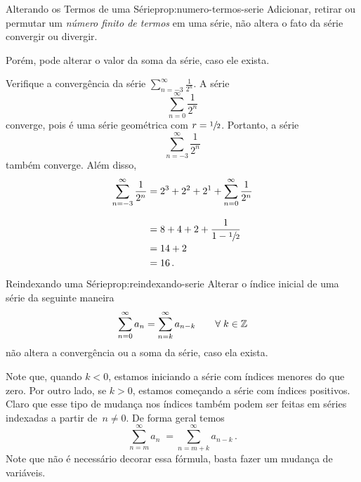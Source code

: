 \begin{proposicao}{Alterando os Termos de uma Série}{prop:numero-termos-serie}
  Adicionar, retirar ou permutar um \emph{número finito de termos} em uma série,
  não altera o fato da série convergir ou divergir.

  Porém, pode alterar o valor da soma da série, caso ele exista.
\end{proposicao}

\begin{example}
  Verifique a convergência da série
  \(
    \sum_{n=-3}^\infty \frac{1}{2^n}
  \).
  \solution
  A série
  \[
    \sum_{n=0}^\infty \frac{1}{2^n}
  \]
  converge, pois é uma série geométrica com $r=\sfrac{1}{2}$.
  Portanto, a série
  \[
    \sum_{n=-3}^\infty \frac{1}{2^n}
  \]
  também converge. Além disso,
  \begin{align*}
    \sum_{n=-3}^\infty \frac{1}{2^n} & = 2^3 + 2^2 + 2^1 + \sum_{n=0}^\infty \frac{1}{2^n} \\[3mm]
                                     & = 8 + 4 + 2 + \frac{1}{1-\sfrac{1}{2}}              \\
                                     & = 14 + 2                                            \\
                                     & = 16                                                \,.
  \end{align*}
\end{example}

\begin{proposicao}{Reindexando uma Série}{prop:reindexando-serie}
  Alterar o índice inicial de uma série da seguinte maneira
  \[
    \sum_{n=0}^\infty a_n =
    \sum_{n=k}^\infty a_{n-k} \qquad \forall\; k \in \mathbb{Z}
  \]
  não altera a convergência ou a soma da série, caso ela exista.
\end{proposicao}

Note que, quando $k<0$, estamos iniciando a série com índices menores do que zero.
Por outro lado, se $k>0$, estamos começando a série com índices positivos.
Claro que esse tipo de mudança nos índices também podem ser feitas em séries
indexadas a partir de~$n\neq 0$. De forma geral temos
\[
  \sum_{n=m}^\infty a_n \;=\!\!\sum_{n=m+k}^\infty a_{n-k}               \,.
\]
Note que não é necessário decorar essa fórmula, basta fazer um mudança de variáveis.

